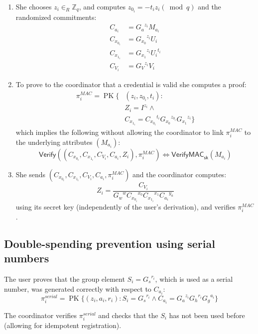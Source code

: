 \documentclass{article}
\begin{document}
\begin{enumerate}

\item She chooses
$z_i \in_{R} \mathbb{Z}_{q}$, and computes
$z_{0_i}=-{t_i} {z_i} (\bmod q)$
and the randomized commitments:
\begin{align*}
C_{a_i}     &= {G_a}^{z_i} M_{a_i} \\
C_{x_{0_i}} &= {G_{x_0}}^{z_i} {U_i} \\
C_{x_{1_i}} &= {G_{x_1}}^{z_i} {U_i}^{t_i} \\
C_{V_i}     &= {G_V}^{z_i} V_i
\end{align*}

\item To prove to the coordinator that a credential is valid she computes a proof:
\begin{align*}
\pi_{i}^{\mathit{MAC}}=\operatorname{PK}\{
& (z_i, z_{0_i},t_i): \\
& Z_i =I^{z_i} \land \\
& C_{x_{1_i}} = {C_{x_{0_i}}}^{t_i} {G_{x_0}}^{z_{0_i}} {G_{x_1}}^{z_i} \}
\end{align*}
which implies the following without allowing the coordinator to link $\pi_{i}^\mathit{MAC}$ to the underlying attributes $(M_{a_i})$:
\[
\mathsf{Verify}((C_{x_{0_i}}, C_{x_{1_i}}, C_{V_i}, C_{a_i}, Z_i), \pi_i^{\mathit{MAC}})
\iff
\mathsf{VerifyMAC}_{\mathsf{sk}}(M_{a_i})
\]

\item She sends $(C_{x_{0_i}}, C_{x_{1_i}}, C_{V_i}, C_{a_i},\pi_i^{\mathit{MAC}})$ and the coordinator computes:
\[
Z_i=\frac{C_{V_i}}{{G_w}^w {C_{x_{0_i}}}^{x_0} {C_{x_{1_i}}}^{x_{1}}
{C_{a_i}}^{y_a}
}
\]
using its secret key (independently of the user's derivation), and verifies $\pi_i^{\mathit{MAC}}$.

\end{enumerate}

\subsection{Double-spending prevention using serial numbers}\label{serial}

The user proves that the group element $S_i = {G_s}^{r_i}$, which is used as a serial number, was generated correctly with respect to $C_{a_i}$:
\[ \pi_{i}^{\mathit{serial}}=\operatorname{PK}\{ (z_i,a_i,r_i): S_i = {G_s}^{r_i} \land C_{a_i} = {G_a}^{z_i}{G_h}^{r_i}{G_g}^{a_i} \} \]

The coordinator verifies $\pi_{i}^{\mathit{serial}}$ and checks that the $S_i$ has not been used before (allowing for idempotent registration).
\end{document}
